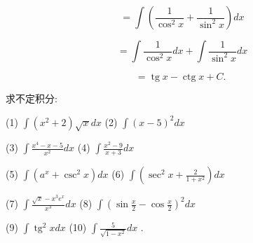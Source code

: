 \documentclass[lang=cn,newtx,10pt,scheme=chinese]{elegantbook}
\begin{document}
\[
= \int \left( {\frac{1}{{\cos }^{2}x} + \frac{1}{{\sin }^{2}x}}\right) {dx}
\]

\[
= \int \frac{1}{{\cos }^{2}x}{dx} + \int \frac{1}{{\sin }^{2}x}{dx}
\]

\[
= \operatorname{tg}x - \operatorname{ctg}x + C\text{. }
\]

\begin{problemset}[练习]

\item 求不定积分:

(1) \(\int \left( {{x}^{2} + 2}\right) \sqrt{x}{dx}\) (2) \(\int {\left( x - 5\right) }^{2}{dx}\)

(3) \(\int \frac{{x}^{4} - x - 5}{{x}^{2}}{dx}\) (4) \(\int \frac{{x}^{2} - 9}{x + 3}{dx}\)

(5) \(\int \left( {{a}^{x} + {\csc }^{2}x}\right) {dx}\) (6) \(\int \left( {{\sec }^{2}x + \frac{2}{1 + {x}^{2}}}\right) {dx}\)

(7) \(\int \frac{\sqrt{x} - {x}^{3}{e}^{x}}{{x}^{3}}{dx}\) (8) \(\int {\left( \sin \frac{x}{2} - \cos \frac{x}{2}\right) }^{2}{dx}\)

(9) \(\int {\operatorname{tg}}^{2}{xdx}\) (10) \(\int \frac{5}{\sqrt{1 - {x}^{2}}}{dx}\) .

\end{problemset}
\end{document}
